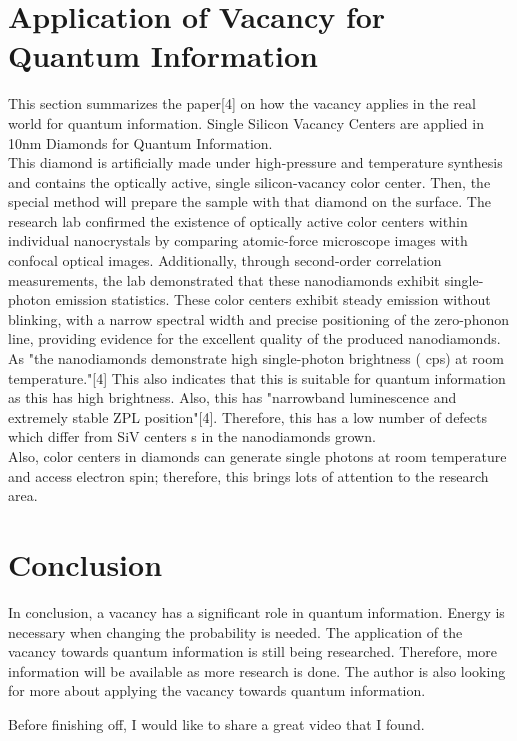 \documentclass{article}
\begin{document}
\section{Application of Vacancy for Quantum Information}
This section summarizes the paper[4] on how the vacancy applies in the real world for quantum information. 
Single Silicon Vacancy Centers are applied in 10nm Diamonds for Quantum Information. \\
This diamond is artificially made under high-pressure and temperature synthesis and contains the optically active, single silicon-vacancy color center.
Then, the special method will prepare the sample with that diamond on the surface. 
The research lab confirmed the existence of optically active color centers within individual nanocrystals by comparing atomic-force microscope images with confocal optical images. 
Additionally, through second-order correlation measurements, the lab demonstrated that these nanodiamonds exhibit single-photon emission statistics. 
These color centers exhibit steady emission without blinking, with a narrow spectral width and precise positioning of the zero-phonon line, providing evidence for the excellent quality of the produced nanodiamonds.
\\
As "the nanodiamonds demonstrate high single-photon brightness ( cps) at room temperature."[4] This also indicates that this is suitable for quantum information as this has high brightness. Also, this has "narrowband luminescence and extremely stable ZPL position"[4]. Therefore, this has a low number of defects which differ from SiV centers s in the nanodiamonds grown.\\

Also, color centers in diamonds can generate single photons at room temperature and access electron spin; therefore, this brings lots of attention to the research area.  
\section{Conclusion}
In conclusion, a vacancy has a significant role in quantum information. Energy is necessary when changing the probability is needed. The application of the vacancy towards quantum information is still being researched. Therefore, more information will be available as more research is done. 
The author is also looking for more about applying the vacancy towards quantum information. 

Before finishing off, I would like to share a great video that I found. 
\end{document}
